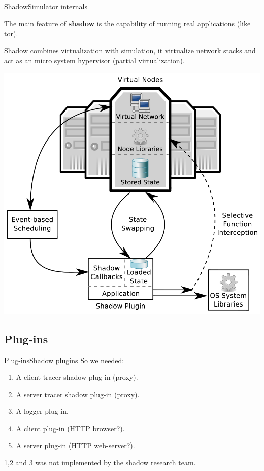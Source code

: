 \begin{frame}{Shadow}{Simulator internals}
	\begin{minipage}{\textwidth}
	The main feature of \textbf{shadow} is the capability of running real
	applications (like tor).
	\end{minipage}
	\begin{minipage}{0.45\textwidth}
	\small
	Shadow combines virtualization with simulation, it virtualize network
	stacks and act as an micro system hypervisor (partial virtualization).
	\normalsize
	\end{minipage}
	\begin{minipage}{0.4\textwidth}
	\begin{center}
		\includegraphics[scale=0.17]{img/shadow.png}
	\end{center}
	\end{minipage}
\end{frame}

\subsection{Plug-ins}

\begin{frame}{Plug-ins}{Shadow plugins}
	So we needed:
	\begin{enumerate}
		\item A client tracer shadow plug-in (proxy).
		\item A server tracer shadow plug-in (proxy).
		\item A logger plug-in.
		\item A client plug-in (HTTP browser?).
		\item A server plug-in (HTTP web-server?).
	\end{enumerate}
	1,2 and 3 was not implemented by the shadow research team.
\end{frame}

